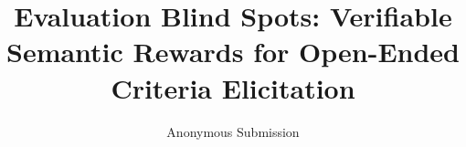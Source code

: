 \documentclass[letterpaper]{article}
\title{Evaluation Blind Spots: Verifiable Semantic Rewards for Open-Ended Criteria Elicitation}
\author{Anonymous Submission}
\date{}
\newif\ifaaaisubmission
\begin{document}
\maketitle










\ifaaaisubmission
  \IfFileExists{aaai2026.bst}{}{}
\else
  
\fi

\end{document}
